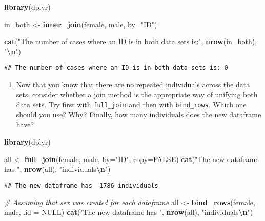 \documentclass[
]{book}
\newenvironment{Shaded}{\begin{snugshade}}{\end{snugshade}}
\newcommand{\AttributeTok}[1]{\textcolor[rgb]{0.13,0.29,0.53}{#1}}
\newcommand{\CommentTok}[1]{\textcolor[rgb]{0.56,0.35,0.01}{\textit{#1}}}
\newcommand{\ConstantTok}[1]{\textcolor[rgb]{0.56,0.35,0.01}{#1}}
\newcommand{\FunctionTok}[1]{\textcolor[rgb]{0.13,0.29,0.53}{\textbf{#1}}}
\newcommand{\NormalTok}[1]{#1}
\newcommand{\OtherTok}[1]{\textcolor[rgb]{0.56,0.35,0.01}{#1}}
\newcommand{\SpecialCharTok}[1]{\textcolor[rgb]{0.81,0.36,0.00}{\textbf{#1}}}
\newcommand{\StringTok}[1]{\textcolor[rgb]{0.31,0.60,0.02}{#1}}
\providecommand{\tightlist}{%
  \setlength{\itemsep}{0pt}\setlength{\parskip}{0pt}}
\begin{document}
\begin{Shaded}
\begin{Highlighting}[]
\FunctionTok{library}\NormalTok{(dplyr)}

\NormalTok{in\_both }\OtherTok{\textless{}{-}} \FunctionTok{inner\_join}\NormalTok{(female, male, }\AttributeTok{by=}\StringTok{"ID"}\NormalTok{)}

\FunctionTok{cat}\NormalTok{(}\StringTok{"The number of cases where an ID is in both data sets is:"}\NormalTok{, }\FunctionTok{nrow}\NormalTok{(in\_both), }\StringTok{"}\SpecialCharTok{\textbackslash{}n}\StringTok{"}\NormalTok{)}
\end{Highlighting}
\end{Shaded}

\begin{verbatim}
## The number of cases where an ID is in both data sets is: 0
\end{verbatim}

\begin{enumerate}
\def\labelenumi{\arabic{enumi}.}
\setcounter{enumi}{2}
\tightlist
\item
  Now that you know that there are no repeated individuals across the data sets, consider whether a join method is the appropriate way of unifying both data sets. Try first with \texttt{full\_join} and then with \texttt{bind\_rows}. Which one should you use? Why? Finally, how many individuals does the new dataframe have?
\end{enumerate}

\begin{Shaded}
\begin{Highlighting}[]
\FunctionTok{library}\NormalTok{(dplyr)}

\NormalTok{all }\OtherTok{\textless{}{-}} \FunctionTok{full\_join}\NormalTok{(female, male, }\AttributeTok{by=}\StringTok{"ID"}\NormalTok{, }\AttributeTok{copy=}\ConstantTok{FALSE}\NormalTok{)}
\FunctionTok{cat}\NormalTok{(}\StringTok{"The new dataframe has "}\NormalTok{, }\FunctionTok{nrow}\NormalTok{(all), }\StringTok{"individuals}\SpecialCharTok{\textbackslash{}n}\StringTok{"}\NormalTok{)}
\end{Highlighting}
\end{Shaded}

\begin{verbatim}
## The new dataframe has  1786 individuals
\end{verbatim}

\begin{Shaded}
\begin{Highlighting}[]
\CommentTok{\# Assuming that \textasciigrave{}sex\textasciigrave{} was created for each dataframe}
\NormalTok{all }\OtherTok{\textless{}{-}} \FunctionTok{bind\_rows}\NormalTok{(female, male, }\AttributeTok{.id =} \ConstantTok{NULL}\NormalTok{)}
\FunctionTok{cat}\NormalTok{(}\StringTok{"The new dataframe has "}\NormalTok{, }\FunctionTok{nrow}\NormalTok{(all), }\StringTok{"individuals}\SpecialCharTok{\textbackslash{}n}\StringTok{"}\NormalTok{)}
\end{Highlighting}
\end{Shaded}
\end{document}
